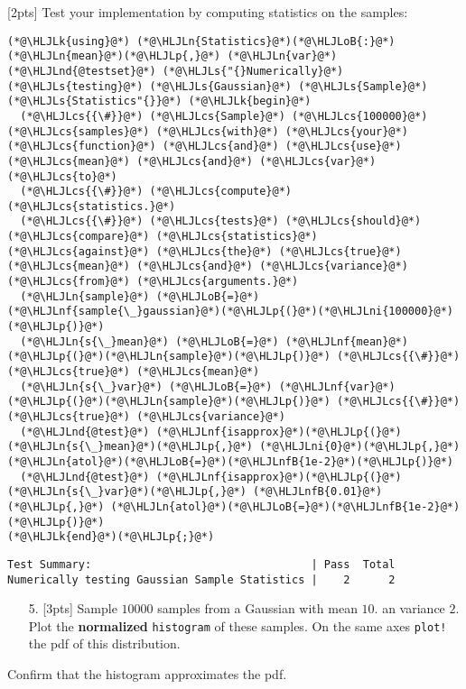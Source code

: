 \documentclass[12pt,a4paper]{article}
\newcommand{\HLJLk}[1]{\textcolor[RGB]{148,91,176}{\textbf{#1}}}
\newcommand{\HLJLn}[1]{#1}
\newcommand{\HLJLnd}[1]{\textcolor[RGB]{214,102,97}{#1}}
\newcommand{\HLJLnf}[1]{\textcolor[RGB]{66,102,213}{#1}}
\newcommand{\HLJLs}[1]{\textcolor[RGB]{201,61,57}{#1}}
\newcommand{\HLJLnfB}[1]{\textcolor[RGB]{59,151,46}{#1}}
\newcommand{\HLJLni}[1]{\textcolor[RGB]{59,151,46}{#1}}
\newcommand{\HLJLoB}[1]{\textcolor[RGB]{102,102,102}{\textbf{#1}}}
\newcommand{\HLJLp}[1]{#1}
\newcommand{\HLJLcs}[1]{\textcolor[RGB]{153,153,119}{\textit{#1}}}
\begin{document}
[2pts] Test your implementation by computing statistics on the samples:


\begin{lstlisting}
(*@\HLJLk{using}@*) (*@\HLJLn{Statistics}@*)(*@\HLJLoB{:}@*) (*@\HLJLn{mean}@*)(*@\HLJLp{,}@*) (*@\HLJLn{var}@*)
(*@\HLJLnd{@testset}@*) (*@\HLJLs{"{}Numerically}@*) (*@\HLJLs{testing}@*) (*@\HLJLs{Gaussian}@*) (*@\HLJLs{Sample}@*) (*@\HLJLs{Statistics"{}}@*) (*@\HLJLk{begin}@*)
  (*@\HLJLcs{{\#}}@*) (*@\HLJLcs{Sample}@*) (*@\HLJLcs{100000}@*) (*@\HLJLcs{samples}@*) (*@\HLJLcs{with}@*) (*@\HLJLcs{your}@*) (*@\HLJLcs{function}@*) (*@\HLJLcs{and}@*) (*@\HLJLcs{use}@*) (*@\HLJLcs{mean}@*) (*@\HLJLcs{and}@*) (*@\HLJLcs{var}@*) (*@\HLJLcs{to}@*)
  (*@\HLJLcs{{\#}}@*) (*@\HLJLcs{compute}@*) (*@\HLJLcs{statistics.}@*)
  (*@\HLJLcs{{\#}}@*) (*@\HLJLcs{tests}@*) (*@\HLJLcs{should}@*) (*@\HLJLcs{compare}@*) (*@\HLJLcs{statistics}@*) (*@\HLJLcs{against}@*) (*@\HLJLcs{the}@*) (*@\HLJLcs{true}@*) (*@\HLJLcs{mean}@*) (*@\HLJLcs{and}@*) (*@\HLJLcs{variance}@*) (*@\HLJLcs{from}@*) (*@\HLJLcs{arguments.}@*)
  (*@\HLJLn{sample}@*) (*@\HLJLoB{=}@*) (*@\HLJLnf{sample{\_}gaussian}@*)(*@\HLJLp{(}@*)(*@\HLJLni{100000}@*)(*@\HLJLp{)}@*)
  (*@\HLJLn{s{\_}mean}@*) (*@\HLJLoB{=}@*) (*@\HLJLnf{mean}@*)(*@\HLJLp{(}@*)(*@\HLJLn{sample}@*)(*@\HLJLp{)}@*) (*@\HLJLcs{{\#}}@*) (*@\HLJLcs{true}@*) (*@\HLJLcs{mean}@*)
  (*@\HLJLn{s{\_}var}@*) (*@\HLJLoB{=}@*) (*@\HLJLnf{var}@*)(*@\HLJLp{(}@*)(*@\HLJLn{sample}@*)(*@\HLJLp{)}@*) (*@\HLJLcs{{\#}}@*) (*@\HLJLcs{true}@*) (*@\HLJLcs{variance}@*)
  (*@\HLJLnd{@test}@*) (*@\HLJLnf{isapprox}@*)(*@\HLJLp{(}@*)(*@\HLJLn{s{\_}mean}@*)(*@\HLJLp{,}@*) (*@\HLJLni{0}@*)(*@\HLJLp{,}@*) (*@\HLJLn{atol}@*)(*@\HLJLoB{=}@*)(*@\HLJLnfB{1e-2}@*)(*@\HLJLp{)}@*)
  (*@\HLJLnd{@test}@*) (*@\HLJLnf{isapprox}@*)(*@\HLJLp{(}@*)(*@\HLJLn{s{\_}var}@*)(*@\HLJLp{,}@*) (*@\HLJLnfB{0.01}@*)(*@\HLJLp{,}@*) (*@\HLJLn{atol}@*)(*@\HLJLoB{=}@*)(*@\HLJLnfB{1e-2}@*)(*@\HLJLp{)}@*)
(*@\HLJLk{end}@*)(*@\HLJLp{;}@*)
\end{lstlisting}

\begin{lstlisting}
Test Summary:                                  | Pass  Total
Numerically testing Gaussian Sample Statistics |    2      2
\end{lstlisting}


\begin{itemize}
\item[5. ] [3pts] Sample $10000$ samples from a Gaussian with mean $10.$ an variance $2$. Plot the \textbf{normalized} \texttt{histogram} of these samples. On the same axes \texttt{plot!} the pdf of this distribution.

\end{itemize}
Confirm that the histogram approximates the pdf.
\end{document}
